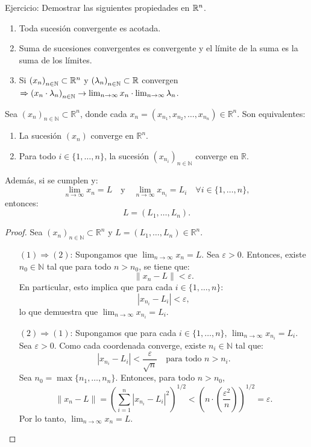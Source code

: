 \begin{prop}
  Ejercicio: Demostrar las siguientes propiedades en \(\mathbb{R}^n\).
  \begin{enumerate}
    \item Toda sucesión convergente es acotada.
    \item Suma de sucesiones convergentes es convergente y el límite de la suma es la suma de los límites.
    \item Si \({(x_n)}_{n \in \mathbb{N}} \subset \mathbb{R}^n\) y \({(\lambda_n)}_{n \in \mathbb{N}} \subset \mathbb{R} \) convergen \(\Rightarrow {(x_n \cdot \lambda_n)}_{n \in \mathbb{N}} \to \lim_{n \to \infty} x_n \cdot \lim_{n \to \infty} \lambda_n\).
  \end{enumerate}
\end{prop}

\begin{prop}
  Sea \({(x_n)}_{n \in \mathbb{N}} \subset \mathbb{R}^n\), donde cada \(x_n = (x_{n_1}, x_{n_2}, \ldots, x_{n_n}) \in \mathbb{R}^n\). Son equivalentes:
  \begin{enumerate}
    \item La sucesión \((x_n)\) converge en \(\mathbb{R}^n\).
    \item Para todo \(i \in \{1, \ldots, n\} \), la sucesión \({(x_{n_i})}_{n \in \mathbb{N}} \) converge en \(\mathbb{R} \).
  \end{enumerate}
  Además, si se cumplen y:
  \[
    \lim_{n \to \infty} x_n = L \quad \text{y} \quad \lim_{n \to \infty} x_{n_i} = L_i \quad \forall i \in \{1, \ldots, n\},
  \]
  entonces:
  \[
    L = (L_1, \ldots, L_n).
  \]
  \begin{proof}
    Sea \({(x_n)}_{n \in \mathbb{N}} \subset \mathbb{R}^n\) y \(L = (L_1, \ldots, L_n) \in \mathbb{R}^n\).
    \begin{enumerate}
      \item[\((1) \Rightarrow (2)\):] Supongamos que \(\lim_{n \to \infty} x_n = L\). Sea \(\varepsilon > 0\). Entonces, existe \(n_0 \in \mathbb{N} \) tal que para todo \(n > n_0\), se tiene que:
            \[
              \|x_n - L\| < \varepsilon.
            \]
            En particular, esto implica que para cada \(i \in \{1, \ldots, n\} \):
            \[
              |x_{n_i} - L_i| < \varepsilon,
            \]
            lo que demuestra que \(\lim_{n \to \infty} x_{n_i} = L_i\).

      \item[\((2) \Rightarrow (1)\):] Supongamos que para cada \(i \in \{1, \ldots, n\} \), \(\lim_{n \to \infty} x_{n_i} = L_i\). Sea \(\varepsilon > 0\). Como cada coordenada converge, existe \(n_i \in \mathbb{N} \) tal que:
            \[
              |x_{n_i} - L_i| < \frac{\varepsilon}{\sqrt{n}} \quad \text{para todo } n > n_i.
            \]
            Sea \(n_0 = \max \{n_1, \ldots, n_n\} \). Entonces, para todo \(n > n_0\),
            \[
              \|x_n - L\| = {\left( \sum_{i=1}^n |x_{n_i} - L_i|^2 \right)}^{1/2} < \left( n \cdot \left( \frac{\varepsilon^2}{n} \right) \right)^{1/2} = \varepsilon.
            \]
            Por lo tanto, \(\lim_{n \to \infty} x_n = L\).
    \end{enumerate}
  \end{proof}
\end{prop}

